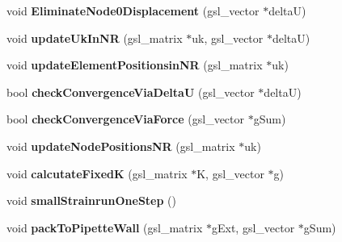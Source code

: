 \begin{DoxyCompactItemize}
\item 
\hypertarget{classSimulation_ad2c44a69af3b25356d5fef46b867d6c5}{}void {\bfseries Eliminate\+Node0\+Displacement} (gsl\+\_\+vector $\ast$delta\+U)\label{classSimulation_ad2c44a69af3b25356d5fef46b867d6c5}

\item 
\hypertarget{classSimulation_a938793b4f60eebdd88f7a3a9791819a0}{}void {\bfseries update\+Uk\+In\+N\+R} (gsl\+\_\+matrix $\ast$uk, gsl\+\_\+vector $\ast$delta\+U)\label{classSimulation_a938793b4f60eebdd88f7a3a9791819a0}

\item 
\hypertarget{classSimulation_aed6fc494b468ebd56c07625d3e5984ff}{}void {\bfseries update\+Element\+Positionsin\+N\+R} (gsl\+\_\+matrix $\ast$uk)\label{classSimulation_aed6fc494b468ebd56c07625d3e5984ff}

\item 
\hypertarget{classSimulation_a0bda2f370a66828c5ca3420ddeeb2d4d}{}bool {\bfseries check\+Convergence\+Via\+Delta\+U} (gsl\+\_\+vector $\ast$delta\+U)\label{classSimulation_a0bda2f370a66828c5ca3420ddeeb2d4d}

\item 
\hypertarget{classSimulation_a8a2b44a93f87f9e0de158c4f422ff13c}{}bool {\bfseries check\+Convergence\+Via\+Force} (gsl\+\_\+vector $\ast$g\+Sum)\label{classSimulation_a8a2b44a93f87f9e0de158c4f422ff13c}

\item 
\hypertarget{classSimulation_aea943e8e0caf1b9ff8e40b61248024b6}{}void {\bfseries update\+Node\+Positions\+N\+R} (gsl\+\_\+matrix $\ast$uk)\label{classSimulation_aea943e8e0caf1b9ff8e40b61248024b6}

\item 
\hypertarget{classSimulation_a0964cdce312e239d588d0dd9cade5190}{}void {\bfseries calcutate\+Fixed\+K} (gsl\+\_\+matrix $\ast$K, gsl\+\_\+vector $\ast$g)\label{classSimulation_a0964cdce312e239d588d0dd9cade5190}

\item 
\hypertarget{classSimulation_a977de0c85607b9c8e4422ca90776e72a}{}void {\bfseries small\+Strainrun\+One\+Step} ()\label{classSimulation_a977de0c85607b9c8e4422ca90776e72a}

\item 
\hypertarget{classSimulation_a645f89e66356cf4e79def5038d19592b}{}void {\bfseries pack\+To\+Pipette\+Wall} (gsl\+\_\+matrix $\ast$g\+Ext, gsl\+\_\+vector $\ast$g\+Sum)\label{classSimulation_a645f89e66356cf4e79def5038d19592b}


\end{DoxyCompactItemize}
